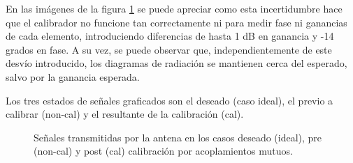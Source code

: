 En las imágenes de la figura \ref{fig:chirpErrMutual0deg} se puede apreciar como esta incertidumbre hace que el calibrador 
no funcione tan correctamente ni para medir fase ni ganancias de cada elemento, introduciendo diferencias de hasta 1 dB en 
ganancia y -14 grados en fase. A su vez, se puede observar que, independientemente de este desvío introducido, los diagramas de 
radiación se mantienen cerca del esperado, salvo por la ganancia esperada.

Los tres estados de señales graficados son el deseado (caso ideal), el previo a calibrar (non-cal) y el resultante de la
calibración (cal).
\begin{figure}[H]
	\centering

	\caption{Señales transmitidas por la antena en los casos deseado (ideal), pre (non-cal) y post (cal) calibración por acoplamientos mutuos.}
	\label{fig:chirpErrMutual0deg}
\end{figure}

